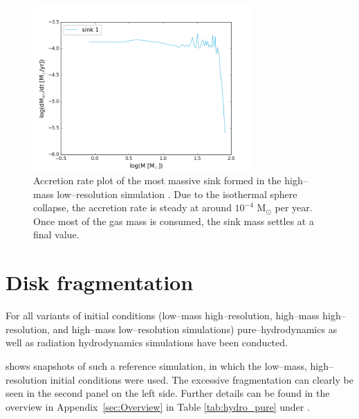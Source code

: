 \begin{figure}[!htb]
 \centering
 \includegraphics[width=0.75\textwidth]{Figures/smacc_m_selfsim_merge}
 \captionsetup{justification=justified,singlelinecheck=false,width=\linewidth}
 \decoRule
 \caption[Sink accretion rate plot of a pure--hydrodynamics run]{Accretion rate plot of the most massive sink formed in the high--mass low--resolution simulation .
                                                                 Due to the isothermal sphere collapse, the accretion rate is steady at around $10^{-4}$ M$_{\odot}$ per year.
                                                                 Once most of the gas mass is consumed, the sink mass settles at a final value.}
\label{fig:smaccm_selfsim}
\end{figure}
\FloatBarrier

\section{Disk fragmentation}
\label{sec:Idealized_core_collapses}

For all variants of initial conditions (low--mass high--resolution, high--mass high--resolution, and high--mass low--resolution simulations) pure--hydrodynamics as well as radiation hydrodynamics simulations have been conducted.

 shows snapshots of such a reference simulation, in which the low--mass, high--resolution initial conditions were used.
The excessive fragmentation can clearly be seen in the second panel on the left side.
Further details can be found in the overview in Appendix~\ref{sec:Overview} in Table \ref{tab:hydro_pure} under .

